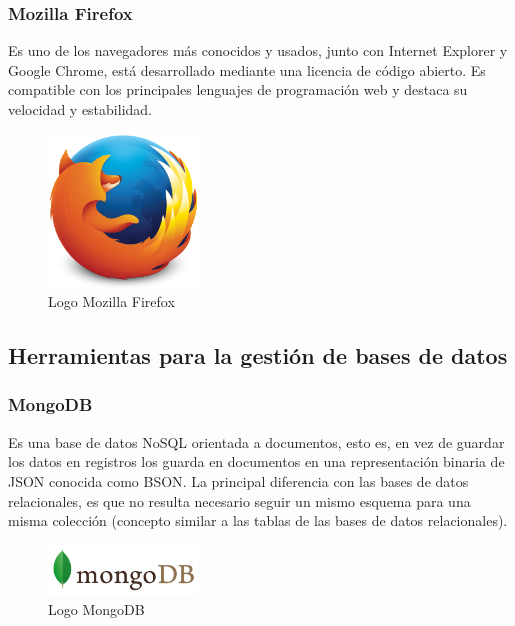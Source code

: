 		\subsubsection{Mozilla Firefox}		
		Es uno de los navegadores más conocidos y usados, junto con Internet Explorer y Google Chrome, está desarrollado mediante una licencia de código abierto.
		Es compatible con los principales lenguajes de programación web y destaca su velocidad y estabilidad.

		\begin{figure}[H]
		\centering
		\includegraphics[width=40mm, fbox={\fboxrule} 4mm]{images/04-metodo/38-firefox_logo}
		\caption{Logo Mozilla Firefox}
		\label{fig:firefox-logo}
		\end{figure}
		
	\subsection{Herramientas para la gestión de bases de datos}
		\subsubsection{MongoDB}
		Es una base de datos NoSQL orientada a documentos, esto es, en vez de guardar los datos en registros los guarda en documentos en una representación binaria de \ac{JSON} conocida como \ac{BSON}. La principal diferencia con las bases de datos relacionales, es que no resulta necesario seguir un mismo esquema para una misma colección (concepto similar a las tablas de las bases de datos relacionales).
		
		\begin{figure}[H]
		\centering
		\includegraphics[width=40mm, fbox={\fboxrule} 4mm]{images/04-metodo/31-mongodb_logo.png}
		\caption{Logo MongoDB}
		\label{fig:mongodb-logo}
		\end{figure}	
		
